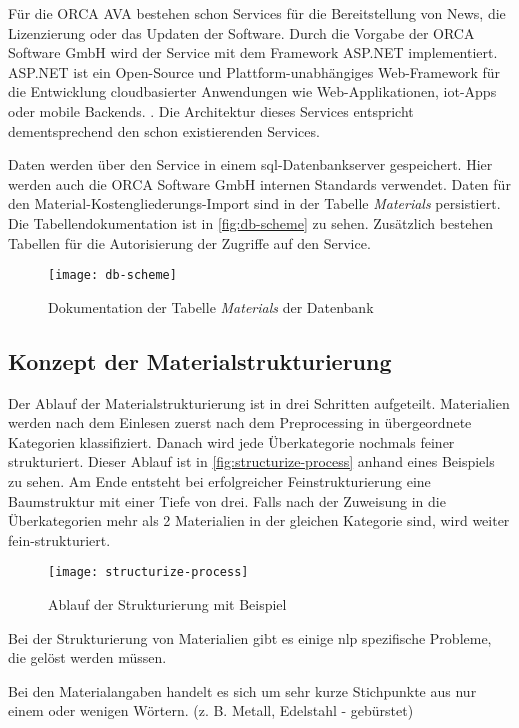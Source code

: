 Für die ORCA AVA bestehen schon Services für die Bereitstellung von News, die Lizenzierung oder das Updaten der Software. Durch die Vorgabe der ORCA Software GmbH wird der Service mit dem Framework ASP.NET implementiert. ASP.NET ist ein Open-Source und Plattform-unabhängiges Web-Framework für die Entwicklung cloudbasierter Anwendungen wie Web-Applikationen, \ac{iot}-Apps oder mobile Backends. \citep[vgl.][]{asp-net}. Die Architektur dieses Services entspricht dementsprechend den schon existierenden Services.

Daten werden über den Service in einem \ac{sql}-Datenbankserver gespeichert. Hier werden auch die ORCA Software GmbH internen Standards verwendet. Daten für den Material-Kostengliederungs-Import sind in der Tabelle \textit{Materials} persistiert. Die Tabellendokumentation ist in \autoref{fig:db-scheme} zu sehen. Zusätzlich bestehen Tabellen für die Autorisierung der Zugriffe auf den Service.

\begin{figure}[h]
	\centering
	\texttt{[image: db-scheme]}
	\caption[Dokumentation]{Dokumentation der Tabelle \textit{Materials} der Datenbank}
	\label{fig:db-scheme}
\end{figure}

\subsection{Konzept der Materialstrukturierung}
\label{c:conception:architecture:structuring}
Der Ablauf der Materialstrukturierung ist in drei Schritten aufgeteilt. Materialien werden nach dem Einlesen zuerst nach dem Preprocessing in übergeordnete Kategorien klassifiziert. Danach wird jede Überkategorie nochmals feiner strukturiert.
Dieser Ablauf ist in \autoref{fig:structurize-process} anhand eines Beispiels zu sehen. Am Ende entsteht bei erfolgreicher Feinstrukturierung eine Baumstruktur mit einer Tiefe von drei. Falls nach der Zuweisung in die Überkategorien mehr als 2 Materialien in der gleichen Kategorie sind, wird weiter fein-strukturiert.

\begin{figure}[h]
	\centering
	\texttt{[image: structurize-process]}
	\caption[Ablauf]{Ablauf der Strukturierung mit Beispiel }
	\label{fig:structurize-process}
\end{figure}

Bei der Strukturierung von Materialien gibt es einige \ac{nlp} spezifische Probleme, die gelöst werden müssen. 
\begin{problem}
	\label{p:shorttext}
	Bei den Materialangaben handelt es sich um sehr kurze Stichpunkte aus nur einem oder wenigen Wörtern. (z. B. Metall, Edelstahl - gebürstet)
\end{problem}

